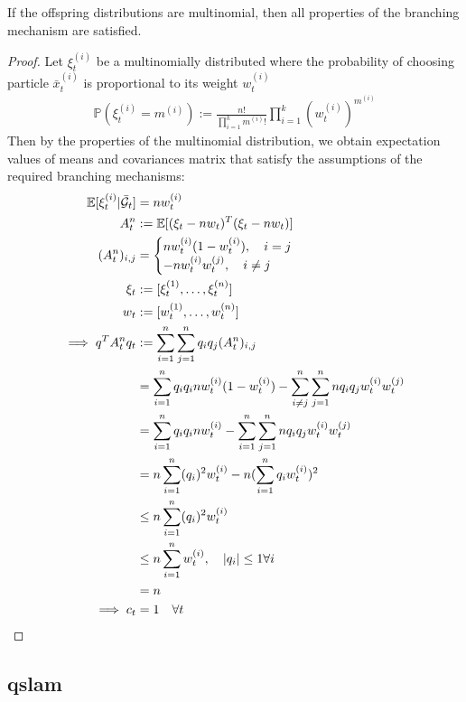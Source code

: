 \begin{lemma} 
	If the offspring distributions are multinomial, then all properties of the branching mechanism are satisfied. 
		\begin{proof}
		Let $\xi_t^{(i)}$ be a multinomially distributed where the probability of choosing particle $\bar{x}_t^{(i)}$ is proportional to its weight  $w_t^{(i)}$
		\begin{align}
		\mathbb{P}(\xi_t^{(i)} = m^{(i)}) := \frac{n!}{\prod_{i=1}^{k} m^{(i)}!} \prod_{i=1}^{k}( w_t^{(i)})^{m^{(i)}}
		\end{align}
		Then by the properties of the multinomial distribution, we obtain expectation values of means and covariances matrix that satisfy the assumptions of the required branching mechanisms:
		\begin{align}
		\mathbb{E}[\xi_t^{(i)} | \bar{\mathcal{G}}_t ] &= n  w_t^{(i)} \\
		A_t^n & := \mathbb{E}[(\xi_t - nw_t)^T(\xi_t - nw_t)] \\
		(A_t^n)_{i,j} &=\begin{cases}
		n w_t^{(i)} (1 - w_t^{(i)}), \quad  i =j \\
		- n w_t^{(i)} w_t^{(j)}, \quad  i \neq j 
		\end{cases}\\
		\xi_t &:= [ \xi_t^{(1)}, \hdots, \xi_t^{(n)}]\\
		w_t &:= [w_t^{(1)}, \hdots, w_t^{(n)}] \\
		\implies q^T A_t^n q_t & := \sum_{i=1}^n \sum_{j=1}^n q_i q_j (A_t^n)_{i,j} \\
		&= \sum_{i=1}^n q_i q_i n w_t^{(i)} (1 - w_t^{(i)}) - \sum_{i\neq j}^n \sum_{j=1}^n n q_i q_j  w_t^{(i)} w_t^{(j)} \\
		&= \sum_{i=1}^n q_i q_i n w_t^{(i)} - \sum_{i= 1}^n \sum_{j=1}^n n q_i q_j  w_t^{(i)} w_t^{(j)} \\
		&= n \sum_{i=1}^n (q_i)^2 w_t^{(i)} - n (\sum_{i= 1}^n  q_i w_t^{(i)})^2 \\
		&\leq  n \sum_{i=1}^n (q_i)^2 w_t^{(i)} \\
		&\leq  n \sum_{i=1}^n w_t^{(i)}, \quad |q_i| \leq 1 \forall i \\
		&=  n \\
		\implies c_t &= 1 \quad \forall t
		\end{align} 
		\end{proof}
\end{lemma}


\subsection{qslam}

